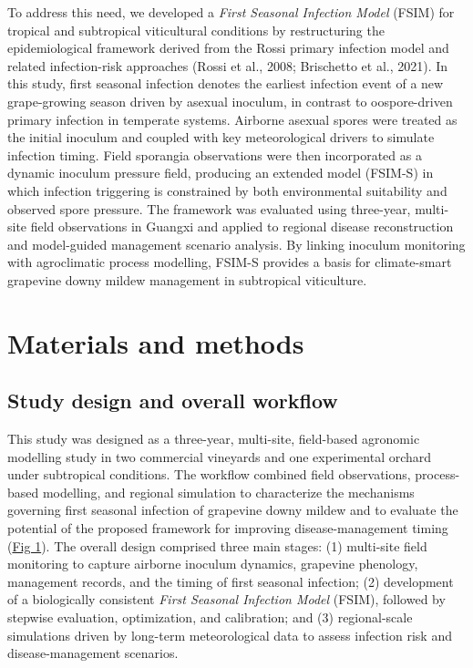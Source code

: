 \documentclass[
]{article}
\begin{document}
To address this need, we developed a \emph{First Seasonal Infection
Model} (FSIM) for tropical and subtropical viticultural conditions by
restructuring the epidemiological framework derived from the Rossi
primary infection model and related infection-risk approaches (Rossi et
al., 2008; Brischetto et al., 2021). In this study, first seasonal
infection denotes the earliest infection event of a new grape-growing
season driven by asexual inoculum, in contrast to oospore-driven primary
infection in temperate systems. Airborne asexual spores were treated as
the initial inoculum and coupled with key meteorological drivers to
simulate infection timing. Field sporangia observations were then
incorporated as a dynamic inoculum pressure field, producing an extended
model (FSIM-S) in which infection triggering is constrained by both
environmental suitability and observed spore pressure. The framework was
evaluated using three-year, multi-site field observations in Guangxi and
applied to regional disease reconstruction and model-guided management
scenario analysis. By linking inoculum monitoring with agroclimatic
process modelling, FSIM-S provides a basis for climate-smart grapevine
downy mildew management in subtropical viticulture.

\section{Materials and methods}\label{materials-and-methods}

\subsection{Study design and overall
workflow}\label{study-design-and-overall-workflow}

This study was designed as a three-year, multi-site, field-based
agronomic modelling study in two commercial vineyards and one
experimental orchard under subtropical conditions. The
workflow combined field observations, process-based modelling, and
regional simulation to characterize the mechanisms governing first
seasonal infection of grapevine downy mildew and to evaluate the
potential of the proposed framework for improving disease-management timing
(\hyperref[_Ref225433957]{Fig 1}). The overall design comprised three
main stages: (1) multi-site field monitoring to capture airborne
inoculum dynamics, grapevine phenology, management records, and the
timing of first seasonal infection; (2) development of a biologically
consistent \emph{First Seasonal Infection Model} (FSIM), followed by
stepwise evaluation, optimization, and calibration; and (3)
regional-scale simulations driven by long-term meteorological data to
assess infection risk and disease-management scenarios.
\end{document}
